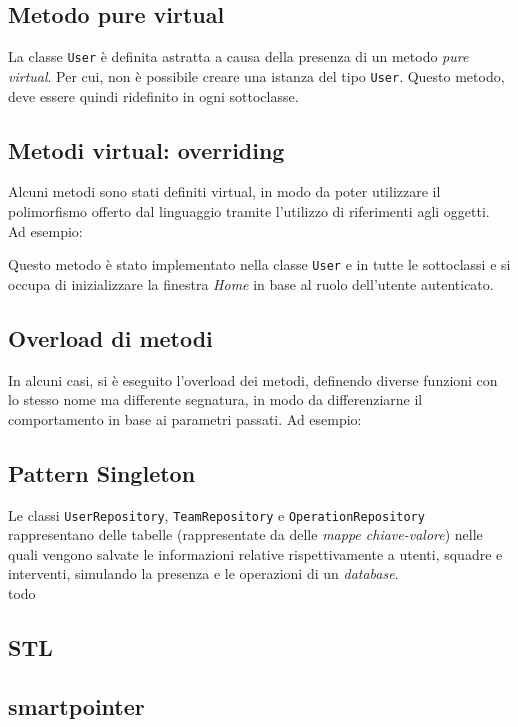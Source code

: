 \subsection{Metodo pure virtual}
La classe \texttt{User} è definita astratta a causa della presenza di un metodo \textit{pure virtual}. Per cui, non è possibile creare una istanza del tipo \texttt{User}. Questo metodo, deve essere quindi ridefinito in ogni sottoclasse.


\subsection{Metodi virtual: overriding}
Alcuni metodi sono stati definiti virtual, in modo da poter utilizzare il polimorfismo offerto dal linguaggio tramite l'utilizzo di riferimenti agli oggetti. Ad esempio:

Questo metodo è stato implementato nella classe \texttt{User} e in tutte le sottoclassi e si occupa di inizializzare la finestra \textit{Home} in base al ruolo dell'utente autenticato.

\subsection{Overload di metodi}
In alcuni casi, si è eseguito l'overload dei metodi, definendo diverse funzioni con lo stesso nome ma differente segnatura, in modo da differenziarne il comportamento in base ai parametri passati. Ad esempio:


\subsection{Pattern Singleton}
Le classi \texttt{UserRepository}, \texttt{TeamRepository} e \texttt{OperationRepository} rappresentano delle tabelle (rappresentate da delle \textit{mappe chiave-valore}) nelle quali vengono salvate le informazioni relative rispettivamente a utenti, squadre e interventi, simulando la presenza e le operazioni di un \textit{database}. 
\\todo
\subsection{STL}
\subsection{smartpointer}